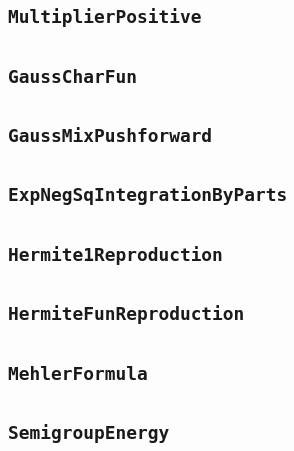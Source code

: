 \documentclass[11pt]{amsart}
\theoremstyle{definition}
\begin{document}
\subsection{\texorpdfstring{\texttt{MultiplierPositive}}{MultiplierPositive}}\label{node:MultiplierPositive}


\subsection{\texorpdfstring{\texttt{GaussCharFun}}{GaussCharFun}}\label{node:GaussCharFun}


\subsection{\texorpdfstring{\texttt{GaussMixPushforward}}{GaussMixPushforward}}\label{node:GaussMixPushforward}


\subsection{\texorpdfstring{\texttt{ExpNegSqIntegrationByParts}}{ExpNegSqIntegrationByParts}}\label{node:ExpNegSqIntegrationByParts}


\subsection{\texorpdfstring{\texttt{Hermite1Reproduction}}{Hermite1Reproduction}}\label{node:Hermite1Reproduction}


\subsection{\texorpdfstring{\texttt{HermiteFunReproduction}}{HermiteFunReproduction}}\label{node:HermiteFunReproduction}


\subsection{\texorpdfstring{\texttt{MehlerFormula}}{MehlerFormula}}\label{node:MehlerFormula}


\subsection{\texorpdfstring{\texttt{SemigroupEnergy}}{SemigroupEnergy}}\label{node:SemigroupEnergy}

\end{document}
